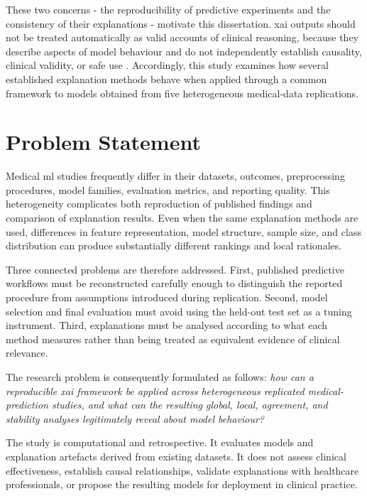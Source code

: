 These two concerns - the reproducibility of predictive experiments and the consistency of their explanations - motivate this dissertation. \gls{xai} outputs should not be treated automatically as valid accounts of clinical reasoning, because they describe aspects of model behaviour and do not independently establish causality, clinical validity, or safe use \citep{tjoa_survey_2021, yang_unbox_2021, vilone_classification_2021}. Accordingly, this study examines how several established explanation methods behave when applied through a
common framework to models obtained from five heterogeneous medical-data replications.

\section{Problem Statement}

Medical \gls{ml} studies frequently differ in their datasets, outcomes, preprocessing procedures, model families, evaluation metrics, and reporting quality. This heterogeneity complicates both reproduction of published findings and comparison of explanation results. Even when the same explanation methods are used, differences in feature representation, model structure, sample size, and class distribution can produce substantially different rankings and local rationales.

Three connected problems are therefore addressed. First, published predictive workflows must be reconstructed carefully enough to distinguish the reported procedure from assumptions introduced during replication. Second, model selection and final evaluation must avoid using the held-out test set as a tuning instrument. Third, explanations must be analysed according to what each method measures rather than being treated as equivalent evidence of clinical relevance.

The research problem is consequently formulated as follows: \emph{how can a reproducible \gls{xai} framework be applied across heterogeneous replicated medical-prediction studies, and what can the resulting global, local, agreement, and stability analyses legitimately reveal about model behaviour?}

The study is computational and retrospective. It evaluates models and explanation artefacts derived from existing datasets. It does not assess clinical effectiveness, establish causal relationships, validate explanations with healthcare professionals, or propose the
resulting models for deployment in clinical practice.

